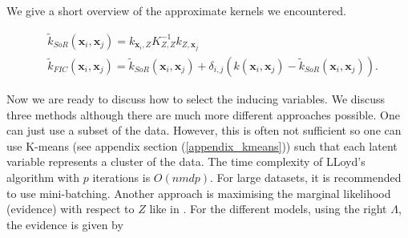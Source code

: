 \documentclass[12pt,a4paper,oneside]{book}
\begin{document}
We give a short overview of the approximate kernels we encountered.

\begin{align}\label{sor_and_fic}
& \tilde{k}_{SoR} ({\bm{x}_i,\bm{x}_j}) = k_{\bm{x}_i,Z} K^{-1}_{Z,Z} k_{Z,\bm{x}_j} \\
& \tilde{k}_{FIC} ({\bm{x}_i,\bm{x}_j}) = \tilde{k}_{SoR} ({\bm{x}_i,\bm{x}_j}) + \delta_{i,j} \left( k ({\bm{x}_i,\bm{x}_j}) - \tilde{k}_{SoR} ({\bm{x}_i,\bm{x}_j}) \right).
\end{align}

Now we are ready to discuss how to select the inducing variables. We discuss three methods although there are much more different approaches possible. One can just use a subset of the data. However, this is often not sufficient so one can use K-means (see appendix section (\ref{appendix_kmeans})) such that each latent variable represents a cluster of the data. The time complexity of LLoyd's algorithm with $p$ iterations is $O(nmdp)$. For large datasets, it is recommended to use mini-batching.  Another approach is maximising the marginal likelihood (evidence) with respect to $Z$ like in \cite{snelson2006sparse}. For the different models, using the right $\Lambda$, the evidence is given by 
\end{document}
